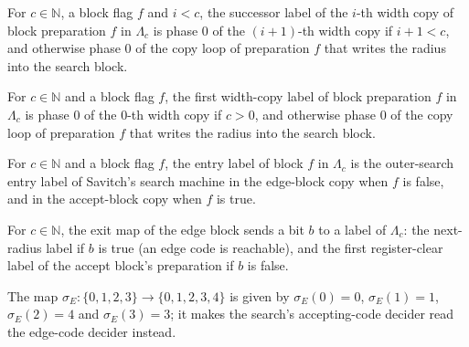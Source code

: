 \begin{definition}
\label{Complexity.LogProg.SavitchARM.dpCtEx}
\leanok
{}
For $c\in\mathbb{N}$, a block flag $f$ and $i<c$, the successor label of the $i$-th width copy of
block preparation $f$ in $\Lambda_c$ is phase $0$ of the $(i+1)$-th width copy if $i+1<c$, and
otherwise phase $0$ of the copy loop of preparation $f$ that writes the radius into the search
block.
\end{definition}

\begin{definition}
\label{Complexity.LogProg.SavitchARM.dpCt0}
\leanok
{}
For $c\in\mathbb{N}$ and a block flag $f$, the first width-copy label of block preparation $f$ in
$\Lambda_c$ is phase $0$ of the $0$-th width copy if $c>0$, and otherwise phase $0$ of the copy
loop of preparation $f$ that writes the radius into the search block.
\end{definition}

\begin{definition}
\label{Complexity.LogProg.SavitchARM.dpIn}
\leanok
{}
For $c\in\mathbb{N}$ and a block flag $f$, the entry label of block $f$ in $\Lambda_c$ is the
outer-search entry label of Savitch's search machine in the edge-block copy when $f$ is false, and
in the accept-block copy when $f$ is true.
\end{definition}

\begin{definition}
\label{Complexity.LogProg.SavitchARM.dpkE}
\leanok
{}
For $c\in\mathbb{N}$, the exit map of the edge block sends a bit $b$ to a label of $\Lambda_c$: the
next-radius label if $b$ is true (an edge code is reachable), and the first register-clear label of
the accept block's preparation if $b$ is false.
\end{definition}

\begin{definition}
\label{Complexity.LogProg.SavitchARM.dpσE}
\leanok
The map $\sigma_E:\{0,1,2,3\}\to\{0,1,2,3,4\}$ is given by $\sigma_E(0)=0$, $\sigma_E(1)=1$,
$\sigma_E(2)=4$ and $\sigma_E(3)=3$; it makes the search's accepting-code decider read the
edge-code decider instead.
\end{definition}

